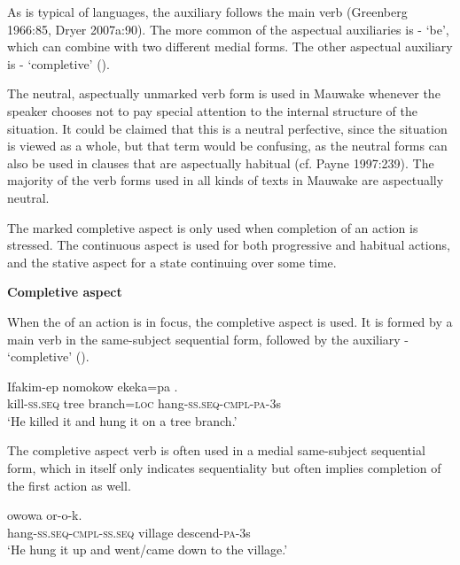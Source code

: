  As is typical of  languages, the auxiliary follows the main verb (Greenberg 1966:85, Dryer 2007a:90). The more common of the aspectual auxiliaries is - `be', which can combine with two different medial forms. The other aspectual auxiliary is - `completive' (). 

The neutral, aspectually unmarked verb form is used in Mauwake whenever the speaker chooses not to pay special attention to the internal structure of the situation. It could be claimed that this is a neutral perfective, since the situation is viewed as a whole, but that term would be confusing, as the neutral forms can also be used in clauses that are aspectually habitual (cf. Payne 1997:239). The majority of the verb forms used in all kinds of texts in Mauwake are aspectually neutral.

The marked completive aspect is only used when completion of an action is stressed. The continuous aspect is used for both progressive and habitual actions, and the stative aspect for a state continuing over some time.

{\bfseries
{}
Completive aspect}

When the  of an action is in focus, the completive aspect is used. It is formed by a main verb in the same-subject sequential form, followed by the auxiliary - `completive' ().

\ea%
\label{ex:x361}
\gll Ifakim-ep nomokow ekeka=pa . \\
kill-\textsc{ss}.\textsc{seq} tree branch=\textsc{loc} hang-\textsc{ss}.\textsc{seq}-\textsc{cmpl}-\textsc{pa}-3s \\
\glt`He killed it and hung it on a tree branch.'
\z

The completive aspect verb is often used in a medial same-subject sequential form, which in itself only indicates sequentiality but often implies completion of the first action as well. 

\ea%
\label{ex:x362}
\gll {} owowa or-o-k. \\
hang-\textsc{ss}.\textsc{seq}-\textsc{cmpl}-\textsc{ss}.\textsc{seq} village descend-\textsc{pa}-3s\\
\glt`He hung it up and went/came down to the village.'
\z

